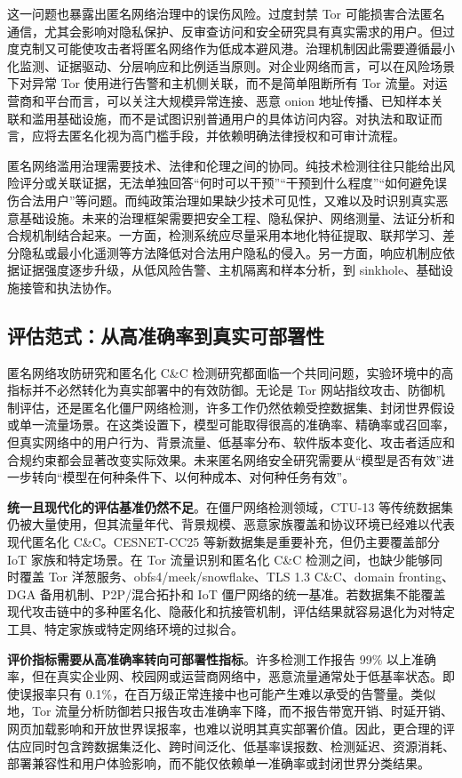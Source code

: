 这一问题也暴露出匿名网络治理中的误伤风险。过度封禁 Tor 可能损害合法匿名通信，尤其会影响对隐私保护、反审查访问和安全研究具有真实需求的用户。但过度克制又可能使攻击者将匿名网络作为低成本避风港。治理机制因此需要遵循最小化监测、证据驱动、分层响应和比例适当原则。对企业网络而言，可以在风险场景下对异常 Tor 使用进行告警和主机侧关联，而不是简单阻断所有 Tor 流量。对运营商和平台而言，可以关注大规模异常连接、恶意 onion 地址传播、已知样本关联和滥用基础设施，而不是试图识别普通用户的具体访问内容。对执法和取证而言，应将去匿名化视为高门槛手段，并依赖明确法律授权和可审计流程。

匿名网络滥用治理需要技术、法律和伦理之间的协同。纯技术检测往往只能给出风险评分或关联证据，无法单独回答“何时可以干预”“干预到什么程度”“如何避免误伤合法用户”等问题。而纯政策治理如果缺少技术可见性，又难以及时识别真实恶意基础设施。未来的治理框架需要把安全工程、隐私保护、网络测量、法证分析和合规机制结合起来。一方面，检测系统应尽量采用本地化特征提取、联邦学习、差分隐私或最小化遥测等方法降低对合法用户隐私的侵入。另一方面，响应机制应依据证据强度逐步升级，从低风险告警、主机隔离和样本分析，到 sinkhole、基础设施接管和执法协作。

\subsection{评估范式：从高准确率到真实可部署性}

匿名网络攻防研究和匿名化 C\&C 检测研究都面临一个共同问题，实验环境中的高指标并不必然转化为真实部署中的有效防御。无论是 Tor 网站指纹攻击、防御机制评估，还是匿名化僵尸网络检测，许多工作仍然依赖受控数据集、封闭世界假设或单一流量场景。在这类设置下，模型可能取得很高的准确率、精确率或召回率，但真实网络中的用户行为、背景流量、低基率分布、软件版本变化、攻击者适应和合规约束都会显著改变实际效果。未来匿名网络安全研究需要从“模型是否有效”进一步转向“模型在何种条件下、以何种成本、对何种任务有效”。

\textbf{统一且现代化的评估基准仍然不足}。在僵尸网络检测领域，CTU-13 等传统数据集仍被大量使用，但其流量年代、背景规模、恶意家族覆盖和协议环境已经难以代表现代匿名化 C\&C。CESNET-CC25 等新数据集是重要补充，但仍主要覆盖部分 IoT 家族和特定场景\cite{oskera2025periodic}。在 Tor 流量识别和匿名化 C\&C 检测之间，也缺少能够同时覆盖 Tor 洋葱服务、obfs4/meek/snowflake、TLS 1.3 C\&C、domain fronting、DGA 备用机制、P2P/混合拓扑和 IoT 僵尸网络的统一基准。若数据集不能覆盖现代攻击链中的多种匿名化、隐蔽化和抗接管机制，评估结果就容易退化为对特定工具、特定家族或特定网络环境的过拟合。

\textbf{评价指标需要从高准确率转向可部署性指标}。许多检测工作报告 99\% 以上准确率，但在真实企业网、校园网或运营商网络中，恶意流量通常处于低基率状态。即使误报率只有 0.1\%，在百万级正常连接中也可能产生难以承受的告警量。类似地，Tor 流量分析防御若只报告攻击准确率下降，而不报告带宽开销、时延开销、网页加载影响和开放世界误报率，也难以说明其真实部署价值。因此，更合理的评估应同时包含跨数据集泛化、跨时间泛化、低基率误报数、检测延迟、资源消耗、部署兼容性和用户体验影响，而不能仅依赖单一准确率或封闭世界分类结果。

